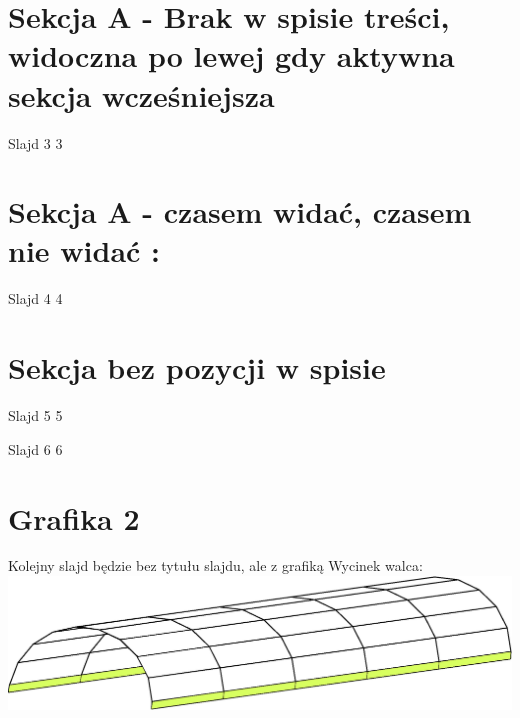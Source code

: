 \documentclass[
  size=14pt,
  mode=present,
  paper=a4paper,
  clock,
  style=sailor
]{powerdot}			%
\begin{document}
\section[tocsection=hidden]{Sekcja A - Brak w spisie treści, widoczna po lewej gdy aktywna sekcja wcześniejsza}
\begin{slide}{Slajd 3}
3	
\end{slide}	
\section{Sekcja A - czasem widać, czasem nie widać :}
\begin{slide}{Slajd 4}
4	
\end{slide}

\section{Sekcja bez pozycji w spisie}
\begin{slide}{Slajd 5}
5	
\end{slide}	

\begin{slide}{Slajd 6}
6
\end{slide}	

\section{Grafika 2}

\begin{slide}{Kolejny slajd będzie bez tytułu slajdu, ale z grafiką}
	\centering
	Wycinek walca:\\
	\includegraphics[width=0.75\slidewidth]{fig_onsolving3d_cylinder.eps}

\end{slide}
\end{document}
